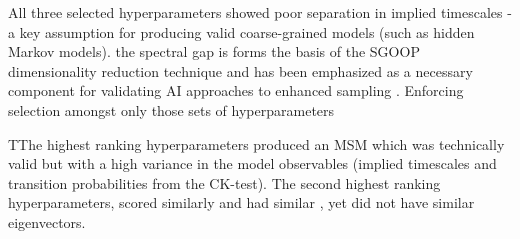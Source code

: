\documentclass[journal=jacsat,manuscript=article]{achemso}
\begin{document}
All three selected hyperparameters showed poor separation in implied timescales - a key assumption for producing valid coarse-grained models (such as hidden Markov models). the spectral gap is forms the basis of the SGOOP\cite{tiwary_spectral_2016} dimensionality reduction technique and has been emphasized as a necessary component for validating AI approaches to enhanced sampling \cite{pant_confronting_2020}. Enforcing selection amongst only those sets of hyperparameters 



TThe highest ranking hyperparameters produced an MSM which was technically valid but with a high variance in the model observables (implied timescales and transition probabilities from the CK-test). The second highest ranking hyperparameters, scored similarly and had similar , yet did not have similar eigenvectors.  










\end{document}
